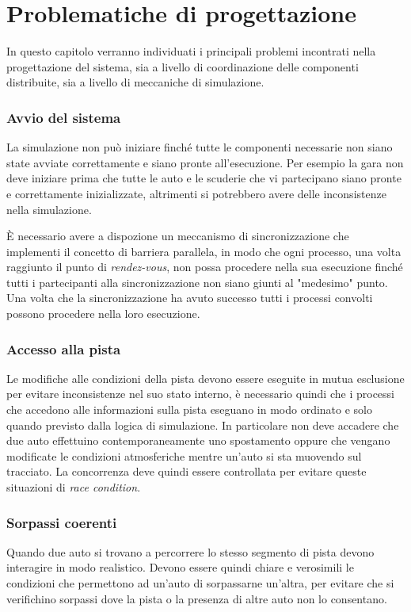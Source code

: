 \chapter{Problematiche di progettazione}

In questo capitolo verranno individuati i principali problemi incontrati nella progettazione del sistema, sia a livello di coordinazione delle componenti distribuite, sia a livello di meccaniche di simulazione.

\subsection*{Avvio del sistema}
La simulazione non può iniziare finché tutte le componenti necessarie non siano state avviate correttamente e siano pronte all'esecuzione. Per esempio la gara non deve iniziare prima che tutte le auto e le scuderie che vi partecipano siano pronte e correttamente inizializzate, altrimenti si potrebbero avere delle inconsistenze nella simulazione.

\`E necessario avere a dispozione un meccanismo di sincronizzazione che implementi il concetto di barriera parallela, in modo che ogni processo, una volta raggiunto il punto di \textsl{rendez-vous}, non possa procedere nella sua esecuzione finché tutti i partecipanti alla sincronizzazione non siano giunti al "medesimo" punto. Una volta che la sincronizzazione ha avuto successo tutti i processi convolti possono procedere nella loro esecuzione.


\subsection*{Accesso alla pista}
Le modifiche alle condizioni della pista devono essere eseguite in mutua esclusione per evitare inconsistenze nel suo stato interno, è necessario quindi che i processi che accedono alle informazioni sulla pista eseguano in modo ordinato e solo quando previsto dalla logica di simulazione. In particolare non deve accadere che due auto effettuino contemporaneamente uno spostamento oppure che vengano modificate le condizioni atmosferiche mentre un'auto si sta muovendo sul tracciato.
La concorrenza deve quindi essere controllata per evitare queste situazioni di \textit{race condition}.

\subsection*{Sorpassi coerenti}
Quando due auto si trovano a percorrere lo stesso segmento di pista devono interagire in modo realistico. Devono essere quindi chiare e verosimili le condizioni che permettono ad un'auto di sorpassarne un'altra, per evitare che si verifichino sorpassi dove la pista o la presenza di altre auto non lo consentano.


